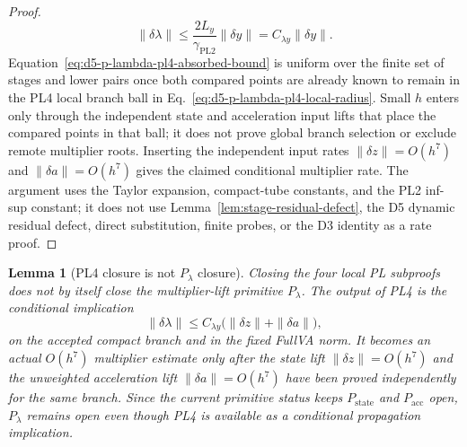 \documentclass[preprint,12pt]{elsarticle}
\newtheorem{lemma}{Lemma}
\begin{document}
\begin{proof}
\begin{equation}
\label{eq:d5-p-lambda-pl4-absorbed-bound}
  \|\delta\lambda\|
  \le \frac{2L_y}{\gamma_{\mathrm{PL2}}}\|\delta y\|
  =C_{\lambda y}\|\delta y\|.
\end{equation}
Equation~\eqref{eq:d5-p-lambda-pl4-absorbed-bound} is uniform over the finite
set of stages and lower pairs once both compared points are already known to
remain in the PL4 local branch ball in
Eq.~\eqref{eq:d5-p-lambda-pl4-local-radius}.  Small \(h\) enters only through
the independent state and acceleration input lifts that place the compared
points in that ball; it does not prove global branch selection or exclude
remote multiplier roots.  Inserting the independent input rates
\(\|\delta z\|=O(h^7)\) and \(\|\delta a\|=O(h^7)\) gives the claimed
conditional multiplier rate.  The argument uses the Taylor expansion,
compact-tube constants, and the PL2 inf-sup constant; it does not use
Lemma~\ref{lem:stage-residual-defect}, the D5 dynamic residual defect,
direct substitution, finite probes, or the D3 identity as a rate proof.
\end{proof}

\begin{lemma}[PL4 closure is not \(P_{\lambda}\) closure]
\label{lem:d5-p-lambda-conditional-nonclosure}
Closing the four local PL subproofs does not by itself close the
multiplier-lift primitive \(P_{\lambda}\).  The output of PL4 is the
conditional implication
\begin{equation}
\label{eq:d5-p-lambda-pl4-conditional-output}
  \|\delta\lambda\|
  \le C_{\lambda y}\bigl(\|\delta z\|+\|\delta a\|\bigr),
\end{equation}
on the accepted compact branch and in the fixed FullVA norm.  It becomes an
actual \(O(h^7)\) multiplier estimate only after the state lift
\(\|\delta z\|=O(h^7)\) and the unweighted acceleration lift
\(\|\delta a\|=O(h^7)\) have been proved independently for the same branch.
Since the current primitive status keeps \(P_{\mathrm{state}}\) and
\(P_{\mathrm{acc}}\) open, \(P_{\lambda}\) remains open even though PL4 is
available as a conditional propagation implication.
\end{lemma}
\end{document}
